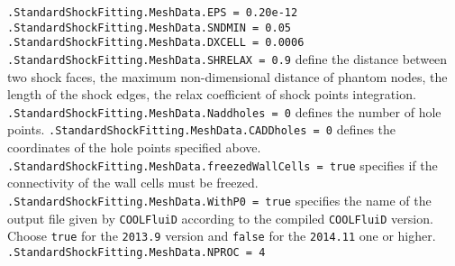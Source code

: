 \documentclass[11pt,a4paper,oneside]{article}
\begin{document}
\hspace*{1cm} \texttt{.StandardShockFitting.MeshData.EPS = 0.20e-12}
\newline
\hspace*{1cm} \texttt{.StandardShockFitting.MeshData.SNDMIN = 0.05}
\newline
\hspace*{1cm} \texttt{.StandardShockFitting.MeshData.DXCELL = 0.0006}
\newline
\hspace*{1cm} \texttt{.StandardShockFitting.MeshData.SHRELAX = 0.9}
\newline
\newline
define the distance between two shock faces, the maximum non-dimensional distance of phantom nodes, the length of the shock edges, the relax coefficient of shock points integration.
\newline
\newline
\hspace*{1cm} \texttt{.StandardShockFitting.MeshData.Naddholes = 0}
\newline
\newline
defines the number of hole points.
\newline
\newline
\hspace*{1cm}  \texttt{.StandardShockFitting.MeshData.CADDholes = 0}
\newline
\newline
defines the coordinates of the hole points specified above.
\newline
\newline
\hspace*{1cm}  \texttt{.StandardShockFitting.MeshData.freezedWallCells = true}
\newline
\newline
specifies if the connectivity of the wall cells must be freezed.
\newline
\newline
\hspace*{1cm} \texttt{.StandardShockFitting.MeshData.WithP0 = true}
\newline
\newline
specifies the name of the output file given by \texttt{COOLFluiD} according to the compiled \texttt{COOLFluiD} version.
Choose \texttt{true} for the \texttt{2013.9} version and \texttt{false} for the \texttt{2014.11} one or higher.
\newline
\newline
\hspace*{1cm}  \texttt{.StandardShockFitting.MeshData.NPROC = 4}
\end{document}
